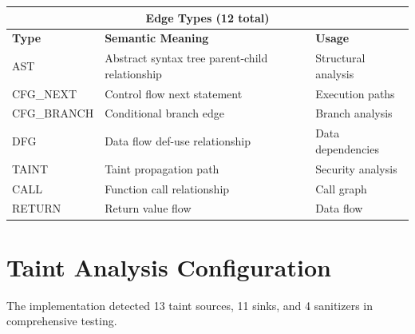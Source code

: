 \begin{table}[H]
\centering
\footnotesize
\begin{tabular}{|l|p{7cm}|p{3cm}|}
\hline
\multicolumn{3}{|c|}{\textbf{Edge Types (12 total)}} \\
\hline
\textbf{Type} & \textbf{Semantic Meaning} & \textbf{Usage} \\
\hline
AST & Abstract syntax tree parent-child relationship & Structural analysis \\
\hline
CFG\_NEXT & Control flow next statement & Execution paths \\
\hline
CFG\_BRANCH & Conditional branch edge & Branch analysis \\
\hline
DFG & Data flow def-use relationship & Data dependencies \\
\hline
TAINT & Taint propagation path & Security analysis \\
\hline
CALL & Function call relationship & Call graph \\
\hline
RETURN & Return value flow & Data flow \\
\hline
\end{tabular}
\end{table}

\section{Taint Analysis Configuration}

The implementation detected 13 taint sources, 11 sinks, and 4 sanitizers in comprehensive testing.


